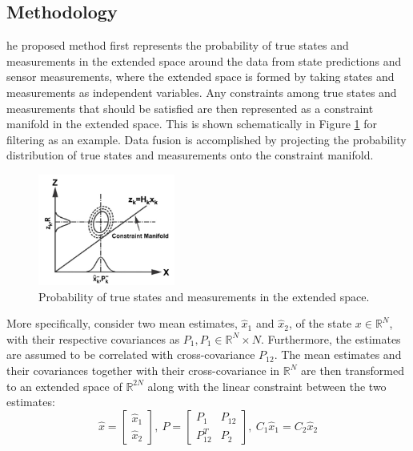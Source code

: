 \documentclass{ieeeaccess}
\begin{document}
\subsection{Methodology}
he proposed method first represents the probability of true states and measurements in the
extended space around the data from state predictions and sensor measurements, where the extended
space is formed by taking states and measurements as independent variables. Any constraints among
true states and measurements that should be satisfied are then represented as a constraint manifold
in the extended space. This is shown schematically in Figure \ref{cpf_manifold} for filtering as an example. Data fusion is accomplished by projecting the probability distribution of true states
and measurements onto the constraint manifold.


\begin{figure}[t!]
  \centering 
  \includegraphics[width=0.4\textwidth]{cpf_manifold.png}
  \caption{Probability of true states and measurements in the extended space.}
  \label{cpf_manifold}
\end{figure}

More specifically, consider two mean estimates, $\hat{x}_1$ and $\hat{x}_2$, of the state $x\in \mathbb{R}^N$, with their
respective covariances as $P_1, P_1\in \mathbb{R}^N\times N$. Furthermore, the estimates are assumed to be correlated with
cross-covariance $P_{12}$. The mean estimates and their covariances together with their cross-covariance in
$\mathbb{R}^N$ are then transformed to an extended space of $\mathbb{R}^{2N}$ along with the linear constraint between the two estimates:
\begin{equation}
\hat{x}=\begin{bmatrix}
\hat{x}_1 \\ \hat{x}_2
\end{bmatrix},\ P=\begin{bmatrix}
P_1 & P_{12} \\ P_{12}^T & P_2
\end{bmatrix},\ C_1\hat{x}_1=C_2\hat{x}_2
\end{equation}
\end{document}
